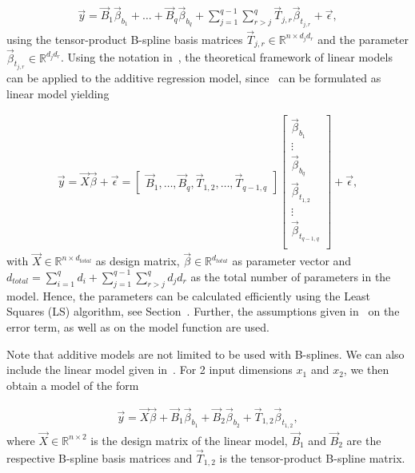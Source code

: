 \begin{align} \label{eq:STAR}
	\vec{y} = \vec{B}_1 \vec{\beta}_{b_1} + \dots + \vec{B}_q \vec{\beta}_{b_q} + \sum_{j=1}^{q-1} \sum_{r>j}^{q} \vec{T}_{j, r} \vec{\beta}_{t_{j, r}} + \vec{\epsilon},
\end{align}
%
using the tensor-product B-spline basis matrices $\vec{T}_{j,r} \in \mathbb{R}^{n \times d_j d_r}$ and the parameter $\vec{\beta}_{t_{j, r}} \in \mathbb{R}^{d_j d_r}$. Using the notation in~, the theoretical framework of linear models can be applied to the additive regression model, since~ can be formulated as linear model yielding

\begin{align} \label{eq:STAR-block-diag}
	\vec{y} = \vec{X} \vec{\beta} + \vec{\epsilon} = 
	\begin{bmatrix}
		\vec{B}_1 , \dots , \vec{B}_q, \vec{T}_{1,2}, \dots, \vec{T}_{q-1, q}    
	\end{bmatrix} \begin{bmatrix} \vec{\beta}_{b_1} \\ 
								  \vdots \\ 
								  \vec{\beta}_{b_q} \\ 
								  \vec{\beta}_{t_{1,2}} \\ 
								  \vdots \\ 
								  \vec{\beta}_{t_{q-1, q}} \\
	\end{bmatrix} + \vec{\epsilon},
\end{align}
%
with $\vec{X} \in \mathbb{R}^{n \times d_{total}}$ as design matrix, $\vec{\beta} \in \mathbb{R}^{d_{total}}$ as parameter vector and $d_{total} = \sum_{i=1}^q d_i + \sum_{j=1}^{q-1} \sum_{r>j}^q d_j d_r$ as the total number of parameters in the model. Hence, the parameters can be calculated efficiently using the Least Squares (LS) algorithm, see Section~. Further, the assumptions given in~ on the error term, as well as on the model function are used.

Note that additive models are not limited to be used with B-splines. We can also include the linear model given in~. For 2 input dimensions $x_1$ and $x_2$, we then obtain a model of the form

\begin{align}
	\vec{y} = \vec{X} \vec{\beta} + \vec{B}_1 \vec{\beta}_{b_1} + \vec{B}_2 \vec{\beta}_{b_2} + \vec{T}_{1,2} \vec{\beta}_{t_{1,2}},
\end{align}
%
where $\vec{X} \in \mathbb{R}^{n \times 2}$ is the design matrix of the linear model, $\vec{B}_1$ and $\vec{B}_2$ are the respective B-spline basis matrices and $\vec{T}_{1,2}$ is the tensor-product B-spline matrix. 

